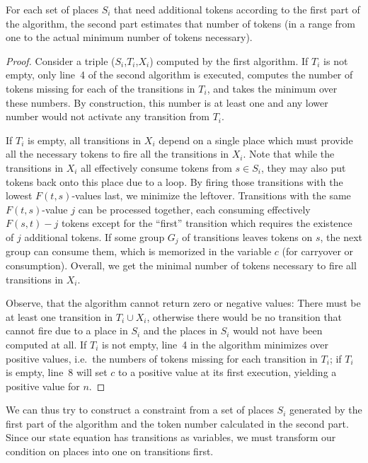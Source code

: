 \documentclass{LMCS}
\begin{document}
\begin{lem}\label{L.ALG2}
For each set of places $S_i$ that need additional tokens according to the first part of the algorithm, the second
part estimates that number of tokens (in a range from one to the actual minimum number of tokens necessary).
\end{lem}
\begin{proof}
Consider a triple ($S_i$,$T_i$,$X_i$) computed by the first algorithm.
If $T_i$ is not empty, only line~4 of the second algorithm is executed, computes the number of tokens missing
for each of the transitions in $T_i$, and takes the minimum over these numbers. By construction, this number is
at least one and any lower number would not activate any transition from $T_i$. 

If $T_i$ is empty, all transitions in $X_i$ depend on a single place which must provide all the
necessary tokens to fire all the transitions in $X_i$. 
Note that while the transitions in $X_i$ all effectively consume tokens from $s\in S_i$, they may also put tokens back onto this
place due to a loop. By firing those transitions with the lowest $F(t,s)$-values last, we minimize the leftover.
Transitions with the same $F(t,s)$-value $j$ can be processed together, each consuming effectively $F(s,t)-j$ tokens
except for the ``first'' transition which requires the existence of $j$ additional tokens. 
If some group $G_j$ of transitions leaves tokens
on $s$, the next group can consume them, which is memorized in the variable $c$ (for carryover or consumption).
Overall, we get the minimal number of tokens necessary to fire all transitions in $X_i$.

Observe, that the algorithm cannot return zero or negative values: 
There must be at least one transition in $T_i\cup X_i$, otherwise
there would be no transition that cannot fire due to a place in $S_i$ and the places in $S_i$ would not have been
computed at all. If $T_i$ is not empty, line~4 in the algorithm minimizes over positive values, i.e.\ the
numbers of tokens missing for each transition in $T_i$; if $T_i$
is empty, line~8 will set $c$ to a positive value at its first execution, yielding a positive value for $n$. 
\end{proof}

We can thus try to construct a constraint from a set of places $S_i$ generated by the first part of the algorithm
and the token number calculated in the second part. Since our state equation has transitions as variables, we
must transform our condition on places into one on transitions first. 
\end{document}
